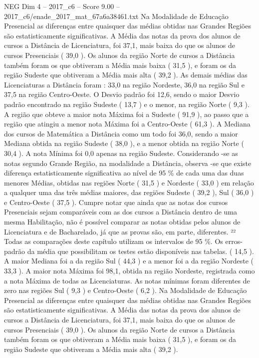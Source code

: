 \begin{textsample}{NEG Dim 4 – 2017\_c6 – Score 9.00 – 2017\_c6/enade\_2017\_mat\_67a6a38461.txt}
Na Modalidade de Educação Presencial as diferenças entre quaisquer das médias obtidas nas Grandes Regiões são estatisticamente significativas.
A Média das notas da prova dos alunos de cursos a Distância de Licenciatura, foi 37,1, mais baixa do que os alunos de cursos Presenciais ( 39,0 ).
Os alunos da região Norte de cursos a Distância também foram os que obtiveram a Média mais baixa ( 31,5 ), e foram os da região Sudeste que obtiveram a Média mais alta ( 39,2 ).
As demais médias das Licenciaturas a Distância foram : 33,0 na região Nordeste, 36,0 na região Sul e 37,5 na região Centro-Oeste.
O Desvio padrão foi 12,6, sendo o maior Desvio padrão encontrado na região Sudeste ( 13,7 ) e o menor, na região Norte ( 9,3 ).
A região que obteve a maior nota Máxima foi a Sudeste ( 91,9 ), ao passo que a região que atingiu a menor nota Máxima foi a Centro-Oeste ( 61,3 ).
A Mediana dos cursos de Matemática a Distância como um todo foi 36,0, sendo a maior Mediana obtida na região Sudeste ( 38,0 ), e a menor obtida na região Norte ( 30,4 ).
A nota Mínima foi 0,0 apenas na região Sudeste.
Considerando -se as notas segundo Grande Região, na modalidade a Distância, observa -se que existe diferença estatisticamente significativa ao nível de 95 \% de cada uma das duas menores Médias, obtidas nas regiões Norte ( 31,5 ) e Nordeste ( 33,0 ) em relação a qualquer uma das três médias maiores, das regiões Sudeste ( 39,2 ), Sul ( 36,0 ) e Centro-Oeste ( 37,5 ).
Cumpre notar que ainda que as notas dos cursos Presenciais sejam comparáveis com as dos cursos a Distância dentro de uma mesma Habilitação, não é possível comparar as notas obtidas pelos alunos de Licenciatura e de Bacharelado, já que as provas são, em parte, diferentes. ²² Todas as comparações deste capítulo utilizam os intervalos de 95 \%.
Os erros-padrão da média que possibilitam os testes estão disponíveis nas tabelas. ( 14,5 ).
A maior Mediana foi a da região Sul ( 44,3 ) e a menor foi a da região Nordeste ( 33,3 ).
A maior nota Máxima foi 98,1, obtida na região Nordeste, registrada como a nota Máxima de todas as Licenciaturas.
As notas mínimas foram diferentes de zero nas regiões Sul ( 9,3 ) e Centro-Oeste ( 6,2 ).
Na Modalidade de Educação Presencial as diferenças entre quaisquer das médias obtidas nas Grandes Regiões são estatisticamente significativas.
A Média das notas da prova dos alunos de cursos a Distância de Licenciatura, foi 37,1, mais baixa do que os alunos de cursos Presenciais ( 39,0 ).
Os alunos da região Norte de cursos a Distância também foram os que obtiveram a Média mais baixa ( 31,5 ), e foram os da região Sudeste que obtiveram a Média mais alta ( 39,2 ).

\end{textsample}
